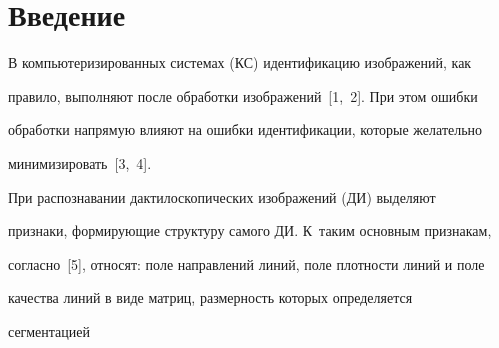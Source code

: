 




\vspace*{-2pt}










\vspace*{-12pt}





\section{Введение}


  


  В компьютеризированных системах (КС) идентификацию изображений, как 


правило, выполняют после обработки изображений~[1,~2]. При этом ошибки 


обработки напрямую влияют на ошибки идентификации, которые желательно 


минимизировать~[3,~4].


  





  


  При распознавании дактилоскопических изображений (ДИ) выделяют 


признаки, формирующие структуру самого ДИ. К~таким основным признакам, 


согласно~[5], относят: поле направлений линий, поле плотности линий и поле 


качества линий в виде матриц, размерность которых определяется 


сегментацией\linebreak\vspace*{-12pt}





\pagebreak





\





\vspace*{-12pt}





